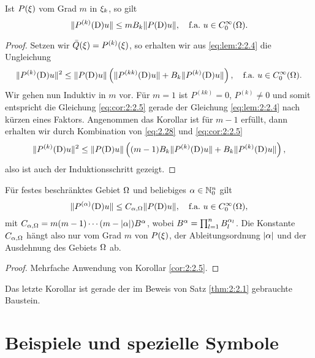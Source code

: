 \begin{cor}\label{cor:2:2.5}
Ist $P(\xi)$ vom Grad $m$ in $\xi_k$, so gilt
\begin{equation}\label{eq:cor:2:2.5}
\lVert P^{(k)}(\mathrm D)u\rVert\leq mB_k\lVert P(\mathrm D)u\rVert,
\quad\text{f.a.}~u\in C^\infty_0(\Omega).
\end{equation}
\end{cor}
\begin{proof}
Setzen wir $\bar{Q}(\xi)=P^{(k)}(\xi)$, so erhalten wir aus \eqref{eq:lem:2:2.4} die Ungleichung
\begin{equation}\label{eq:2.28}
\lVert P^{(k)}(\mathrm D)u\rVert^2\leq\lVert P(\mathrm D)u\rVert\left(\lVert P^{(kk)}(\mathrm D)u\rVert+B_k\lVert P^{(k)}(\mathrm D)u\rVert\right),
\quad\text{f.a.}~u\in C^\infty_0(\Omega).
\end{equation}
Wir gehen nun Induktiv in $m$ vor.
Für $m=1$ ist $P^{(kk)}=0$, $P^{(k)}\neq0$ und somit entspricht die Gleichung \eqref{eq:cor:2:2.5}
gerade der Gleichung \eqref{eq:lem:2:2.4} nach kürzen eines Faktors.
Angenommen das Korollar ist für $m-1$ erfüllt,
dann erhalten wir durch Kombination von \eqref{eq:2.28} und \eqref{eq:cor:2:2.5}
\begin{equation}
\lVert P^{(k)}(\mathrm D)u\rVert^2\leq\lVert P(\mathrm D)u\rVert\left((m-1)B_k\lVert P^{(k)}(\mathrm D)u\rVert+B_k\lVert P^{(k)}(\mathrm D)u\rVert\right),
\end{equation}
also ist auch der Induktionsschritt gezeigt.
\end{proof}

\begin{cor}\label{cor:2:2.6}
Für festes beschränktes Gebiet $\Omega$ und beliebiges $\alpha\in\mathbb N^n_0$ gilt
\begin{equation}
\lVert P^{(\alpha)}(\mathrm D)u\rVert\leq C_{\alpha,\Omega}\lVert P(\mathrm D)u\rVert,
\quad\text{f.a.}~u\in C^\infty_0(\Omega),
\end{equation}
mit $C_{\alpha,\Omega}=m(m-1)\cdots(m-\lvert\alpha\rvert)B^\alpha$, wobei $B^\alpha=\prod_{l=1}^n B^{\alpha_l}_l$.
Die Konstante $C_{\alpha,\Omega}$ hängt also nur vom Grad $m$ von $P(\xi)$,
der Ableitungsordnung $\lvert\alpha\rvert$ und der Ausdehnung des Gebiets $\Omega$ ab.
\end{cor}

\begin{proof}
Mehrfache Anwendung von Korollar \ref{cor:2:2.5}.
\end{proof}

Das letzte Korollar ist gerade der im Beweis von Satz \ref{thm:2:2.1}
gebrauchte Baustein.

\section{Beispiele und spezielle Symbole}

